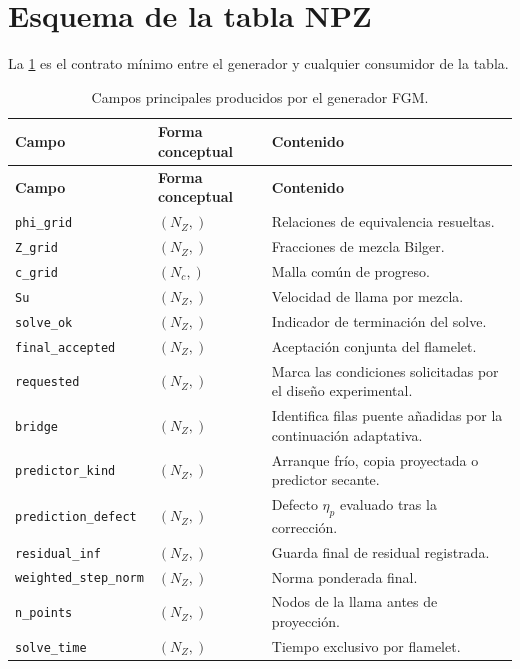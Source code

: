 \documentclass[12pt,a4paper,twoside,openany]{book}
\newcommand{\codigo}[1]{\texttt{#1}}
\begin{document}
\section{Esquema de la tabla NPZ}

La \cref{tab:npz-schema} es el contrato mínimo entre el generador y cualquier
consumidor de la tabla.

\begin{longtable}{@{}p{}p{}p{}@{}}
\caption{Campos principales producidos por el generador FGM.}
\label{tab:npz-schema}\\
\toprule
\textbf{Campo} & \textbf{Forma conceptual} & \textbf{Contenido} \\
\midrule
\endfirsthead
\toprule
\textbf{Campo} & \textbf{Forma conceptual} & \textbf{Contenido} \\
\midrule
\endhead
\codigo{phi\_grid} & \((N_Z,)\) & Relaciones de equivalencia resueltas. \\
\codigo{Z\_grid} & \((N_Z,)\) & Fracciones de mezcla Bilger. \\
\codigo{c\_grid} & \((N_c,)\) & Malla común de progreso. \\
\codigo{Su} & \((N_Z,)\) & Velocidad de llama por mezcla. \\
\codigo{solve\_ok} & \((N_Z,)\) & Indicador de terminación del solve. \\
\codigo{final\_accepted} & \((N_Z,)\) & Aceptación conjunta del flamelet. \\
\codigo{requested} & \((N_Z,)\) & Marca las condiciones solicitadas por el diseño
experimental. \\
\codigo{bridge} & \((N_Z,)\) & Identifica filas puente añadidas por la continuación
adaptativa. \\
\codigo{predictor\_kind} & \((N_Z,)\) & Arranque frío, copia proyectada o predictor secante. \\
\codigo{prediction\_defect} & \((N_Z,)\) & Defecto \(\eta_p\) evaluado tras la corrección. \\
\codigo{residual\_inf} & \((N_Z,)\) & Guarda final de residual registrada. \\
\codigo{weighted\_step\_}\newline\codigo{norm} & \((N_Z,)\) & Norma ponderada final. \\
\codigo{n\_points} & \((N_Z,)\) & Nodos de la llama antes de proyección. \\
\codigo{solve\_time} & \((N_Z,)\) & Tiempo exclusivo por flamelet. \\

\end{longtable}
\end{document}

